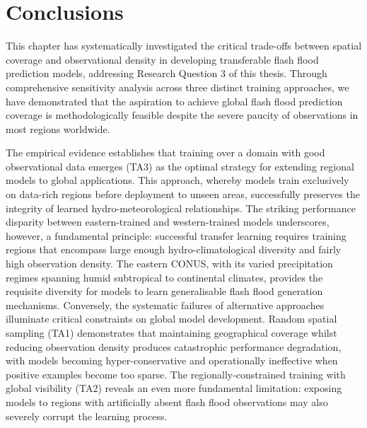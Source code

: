 \section{Conclusions}
\label{regional_to_global_training_conclusions}

This chapter has systematically investigated the critical trade-offs between spatial coverage and observational density in developing transferable flash flood prediction models, addressing Research Question 3 of this thesis. Through comprehensive sensitivity analysis across three distinct training approaches, we have demonstrated that the aspiration to achieve global flash flood prediction coverage is methodologically feasible despite the severe paucity of observations in most regions worldwide.

The empirical evidence establishes that training over a domain with good observational data emerges (TA3) as the optimal strategy for extending regional models to global applications. This approach, whereby models train exclusively on data-rich regions before deployment to unseen areas, successfully preserves the integrity of learned hydro-meteorological relationships. The striking performance disparity between eastern-trained and western-trained models underscores, however, a fundamental principle: successful transfer learning requires training regions that encompass large enough hydro-climatological diversity and fairly high observation density. The eastern CONUS, with its varied precipitation regimes spanning humid subtropical to continental climates, provides the requisite diversity for models to learn generalisable flash flood generation mechanisms. Conversely, the systematic failures of alternative approaches illuminate critical constraints on global model development. Random spatial sampling (TA1) demonstrates that maintaining geographical coverage whilst reducing observation density produces catastrophic performance degradation, with models becoming hyper-conservative and operationally ineffective when positive examples become too sparse. The regionally-constrained training with global visibility (TA2) reveals an even more fundamental limitation: exposing models to regions with artificially absent flash flood observations may also severely corrupt the learning process.

